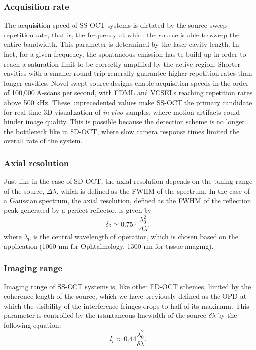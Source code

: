 \subsubsection{Acquisition rate}

The acquisition speed of \ac{SS-OCT} systems is dictated by the source sweep repetition rate, that is, the frequency at which the source is able to sweep the entire bandwidth. This parameter is determined by the laser cavity length. In fact, for a given frequency, the spontaneous emission has to build up in order to reach a saturation limit to be correctly amplified by the active region. Shorter cavities with a smaller round-trip generally guarantee higher repetition rates than longer cavities. Novel swept-source designs enable acquisition speeds in the order of 100,000 A-scans per second, with \ac{FDML} and \acp{VCSEL} reaching repetition rates above 500 kHz. These unprecedented values make \ac{SS-OCT} the primary candidate for real-time 3D visualization of \emph{in vivo} samples, where motion artifacts could hinder image quality. This is possible because the detection scheme is no longer the bottleneck like in \ac{SD-OCT}, where slow camera response times limited the overall rate of the system. 

\subsubsection{Axial resolution}
Just like in the case of \ac{SD-OCT}, the axial resolution depends on the tuning range of the source, $\Delta \lambda$, which is defined as the \ac{FWHM} of the spectrum. In the case of a Gaussian spectrum, the axial resolution, defined as the \ac{FWHM} of the reflection peak generated by a perfect reflector, is given by
\begin{equation}\label{eq:ss-axial-resolution}
	\delta z \simeq 0.75 \cdot \frac{\lambda_0^2}{\Delta \lambda},
\end{equation}
where $\lambda_0$ is the central wavelength of operation, which is chosen based on the application (1060 nm for Ophtalmology, 1300 nm for tissue imaging). 

\subsubsection{Imaging range}
Imaging range of \ac{SS-OCT} systems is, like other \ac{FD-OCT} schemes, limited by the coherence length of the source, which we have previously defined as the \ac{OPD} at which the visibility of the interference fringes drops to half of its maximum. This parameter is controlled by the istantaneous linewidth of the source $\delta \lambda$ by the following equation:
\begin{equation}
	l_c \approx 0.44 \frac{\lambda_0^2}{\delta \lambda}.
\end{equation}

